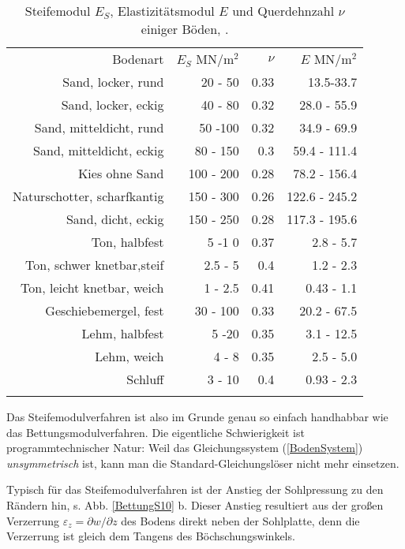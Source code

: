 \begin{table}
{\small \caption{ Steifemodul $E_S$, Elastizit\"{a}tsmodul $E$ und Querdehnzahl $\nu$
einiger B\"{o}den, \protect\cite{EAU}.} \label{Ziffer}
\begin{tabular}{rrrr}
\noalign{\hrule\smallskip}
  Bodenart & $E_S$ MN/m$^2$ & $\nu$ & $E$ MN/m$^2$ \\
\noalign{\hrule\smallskip}
Sand, locker, rund &    20 - 50 &       0.33 &  13.5-33.7 \\
Sand, locker, eckig &    40 - 80 &       0.32 & 28.0 - 55.9 \\
Sand, mitteldicht, rund &    50 -100 &       0.32 & 34.9 - 69.9 \\
Sand, mitteldicht, eckig &   80 - 150 &        0.3 & 59.4 - 111.4 \\
Kies ohne Sand &  100 - 200 &       0.28 & 78.2 - 156.4 \\
Naturschotter, scharfkantig &  150 - 300 &       0.26 & 122.6 - 245.2 \\
Sand, dicht, eckig & 150 - 250  &       0.28 & 117.3 - 195.6 \\
\noalign{\hrule\smallskip}
Ton, halbfest &     5 -1 0 &       0.37 &  2.8 - 5.7 \\
Ton, schwer knetbar,steif &    2.5 - 5 &        0.4 &  1.2 - 2.3 \\
Ton, leicht knetbar, weich &   1 -  2.5 &       0.41 & 0.43 - 1.1 \\
Geschiebemergel, fest &   30 - 100 &       0.33 & 20.2 - 67.5 \\
Lehm, halbfest &      5 -20 &       0.35 & 3.1 - 12.5 \\
Lehm, weich &      4 - 8 &       0.35 &  2.5 - 5.0 \\
   Schluff &     3 - 10 &        0.4 & 0.93 - 2.3 \\
\noalign{\hrule\smallskip}
\end{tabular}
}
\end{table}

Das Steifemodulverfahren ist also im Grunde genau so einfach handhabbar wie das Bettungsmodulverfahren. Die eigentliche Schwierigkeit ist programmtechnischer Natur: Weil das Gleichungssystem (\ref{BodenSystem}) {\em unsymmetrisch\/} ist, kann man die Standard-Gleichungsl\"{o}ser nicht mehr einsetzen.

Typisch f\"{u}r das Steifemodulverfahren ist der Anstieg der Sohlpressung zu den R\"{a}ndern hin, s. Abb. \ref{BettungS10} b. Dieser  Anstieg resultiert aus der gro{\ss}en Verzerrung $\varepsilon_z = \partial w/\partial z$ des Bodens direkt neben der Sohlplatte, denn die Verzerrung ist gleich dem Tangens des B\"{o}chschungswinkels.

